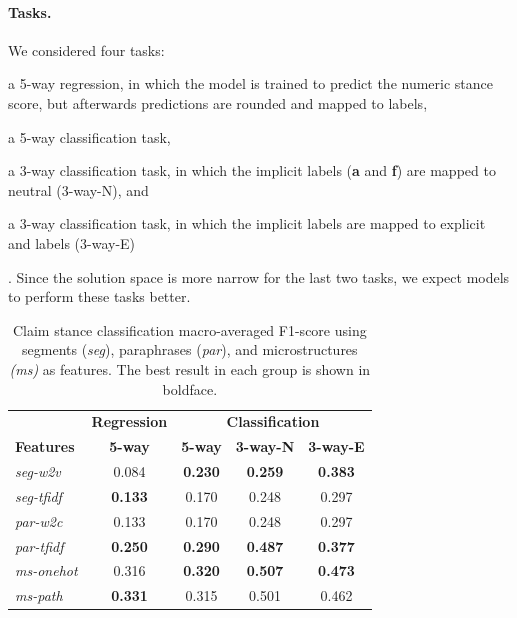 \paragraph{Tasks.}
We considered four tasks:
\begin{enumerate*}[label=(\arabic*)]
\item a 5-way regression, in which the model is trained to predict the
numeric stance score, but afterwards predictions are rounded and mapped to labels,
\item a 5-way classification task,
\item a 3-way classification task, in which the implicit labels (\textbf{a} and \textbf{f}) are
mapped to neutral (3-way-N), and
\item a 3-way classification task, in which the implicit labels are mapped to
explicit  and  labels (3-way-E)
\end{enumerate*}.
Since the solution space is more narrow for the last two tasks, 
we expect models to perform these tasks better. 


\begin{table}[t]
\begin{center}
{
\setlength{\tabcolsep}{5pt}
\begin{tabular}{l cccc}
\toprule
& \textbf{Regression} & \multicolumn{3}{c}{\textbf{Classification}}\\
\cmidrule(lr){2-2}\cmidrule(lr){3-5}
\textbf{Features} & \textbf{5-way} & \textbf{5-way} & \textbf{3-way-N} & \textbf{3-way-E} \\
\midrule
\emph{seg-w2v}    &      0.084  &      \textbf{0.230} &             \textbf{0.259}                     &   \textbf{0.383} \\
\emph{seg-tfidf}      &      \textbf{0.133}  &      0.170 &             0.248                     &   0.297 \\
\midrule
\emph{par-w2c}   &       0.133  &      0.170 &             0.248                     &   0.297 \\
\emph{par-tfidf} &       \textbf{0.250}  &      \textbf{0.290} &             \textbf{0.487}                     &   \textbf{0.377} \\
\midrule
\emph{ms-onehot} &       0.316  &     	\textbf{0.320} & 	\textbf{0.507}                    &   \textbf{0.473} \\
\emph{ms-path}  &  \textbf{0.331}  &     	0.315 &         	0.501                    &    0.462 \\
\bottomrule
\end{tabular}}
\caption{Claim stance classification macro-averaged F1-score using segments
	(\emph{seg}), paraphrases (\emph{par}), and microstructures \emph{(ms)}
	as features. The best result in each group is shown in boldface.}
\label{tab:microstructure_stance_experiment}
\end{center}
\end{table}

